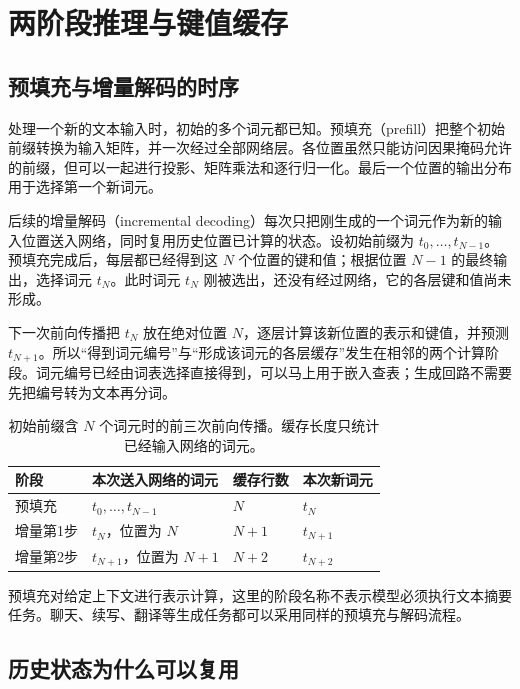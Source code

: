 \section{两阶段推理与键值缓存}
\label{l12:sec:cache}

\subsection{预填充与增量解码的时序}

处理一个新的文本输入时，初始的多个词元都已知。预填充（prefill）把整个初始前缀转换为输入矩阵，并一次经过全部网络层。各位置虽然只能访问因果掩码允许的前缀，但可以一起进行投影、矩阵乘法和逐行归一化。最后一个位置的输出分布用于选择第一个新词元。

后续的增量解码（incremental decoding）每次只把刚生成的一个词元作为新的输入位置送入网络，同时复用历史位置已计算的状态。设初始前缀为 $t_0,\ldots,t_{N-1}$。预填充完成后，每层都已经得到这 $N$ 个位置的键和值；根据位置 $N-1$ 的最终输出，选择词元 $t_N$。此时词元 $t_N$ 刚被选出，还没有经过网络，它的各层键和值尚未形成。

下一次前向传播把 $t_N$ 放在绝对位置 $N$，逐层计算该新位置的表示和键值，并预测 $t_{N+1}$。所以“得到词元编号”与“形成该词元的各层缓存”发生在相邻的两个计算阶段。词元编号已经由词表选择直接得到，可以马上用于嵌入查表；生成回路不需要先把编号转为文本再分词。

\begin{table}[htbp]
\centering
\caption{初始前缀含 $N$ 个词元时的前三次前向传播。缓存长度只统计已经输入网络的词元。}
\label{l12:tab:decode-timeline}
\begin{tabularx}{\linewidth}{@{}L{2.2cm}Y L{3.0cm}L{2.6cm}@{}}
\toprule
阶段 & 本次送入网络的词元 & 缓存行数 & 本次新词元\\
\midrule
预填充 & $t_0,\ldots,t_{N-1}$ & $N$ & $t_N$\\
增量第1步 & $t_N$，位置为 $N$ & $N+1$ & $t_{N+1}$\\
增量第2步 & $t_{N+1}$，位置为 $N+1$ & $N+2$ & $t_{N+2}$\\
\bottomrule
\end{tabularx}
\end{table}

预填充对给定上下文进行表示计算，这里的阶段名称不表示模型必须执行文本摘要任务。聊天、续写、翻译等生成任务都可以采用同样的预填充与解码流程。

\subsection{历史状态为什么可以复用}

